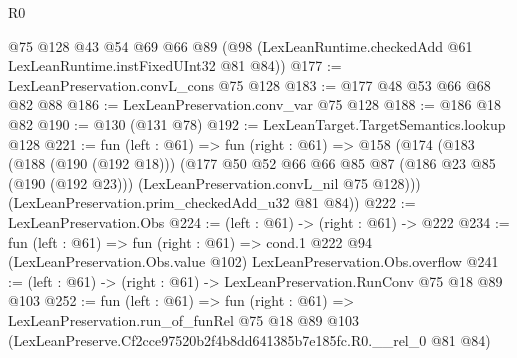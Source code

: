 \begin{lexlean}{R0}
\begin{coremodule}
    @75
    @128
    @43
    @54
    @69
    @66
    @89
    (@98 (LexLeanRuntime.checkedAdd @61 LexLeanRuntime.instFixedUInt32 @81 @84))
@177 := LexLeanPreservation.convL_cons @75 @128
@183 := @177 @48 @53 @66 @68 @82 @88
@186 := LexLeanPreservation.conv_var @75 @128
@188 := @186 @18 @82
@190 := @130 (@131 @78)
@192 := LexLeanTarget.TargetSemantics.lookup @128
@221 := fun (left : @61) =>
  fun (right : @61) =>
  @158
    (@174
      (@183
        (@188 (@190 (@192 @18)))
        (@177
          @50
          @52
          @66
          @66
          @85
          @87
          (@186 @23 @85 (@190 (@192 @23)))
          (LexLeanPreservation.convL_nil @75 @128)))
      (LexLeanPreservation.prim_checkedAdd_u32 @81 @84))
@222 := LexLeanPreservation.Obs
@224 := (left : @61) -> (right : @61) -> @222
@234 := fun (left : @61) =>
  fun (right : @61) =>
  cond.{1} @222 @94 (LexLeanPreservation.Obs.value @102) LexLeanPreservation.Obs.overflow
@241 := (left : @61) -> (right : @61) -> LexLeanPreservation.RunConv @75 @18 @89 @103
@252 := fun (left : @61) =>
  fun (right : @61) =>
  LexLeanPreservation.run_of_funRel
    @75
    @18
    @89
    @103
    (LexLeanPreserve.Cf2cce97520b2f4b8dd641385b7e185fc.R0.__rel_0 @81 @84)
\end{coremodule}
\end{lexlean}
